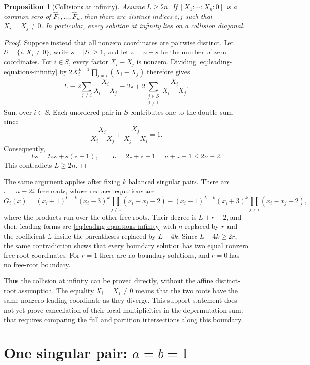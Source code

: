 \documentclass[11pt]{article}
\newtheorem{proposition}{Proposition}[section]
\theoremstyle{definition}
\begin{document}
\begin{proposition}[Collisions at infinity]
\label{prop:collisions-infinity}
Assume $L\ge2n$. If $[X_1:\cdots:X_n:0]$ is a common zero of
$\widehat F_1,\ldots,\widehat F_n$, then there are distinct indices
$i,j$ such that $X_i=X_j\ne0$. In particular, every solution at
infinity lies on a collision diagonal.
\end{proposition}

\begin{proof}
Suppose instead that all nonzero coordinates are pairwise distinct.
Let $S=\{i:X_i\ne0\}$, write $s=|S|\ge1$, and let $z=n-s$ be
the number of zero coordinates. For $i\in S$, every factor
$X_i-X_j$ is nonzero. Dividing
\eqref{eq:leading-equations-infinity} by
$2X_i^{L-1}\prod_{j\ne i}(X_i-X_j)$ therefore gives
\[
 L=2\sum_{j\ne i}\frac{X_i}{X_i-X_j}
   =2z+2\sum_{\substack{j\in S\\j\ne i}}
                     \frac{X_i}{X_i-X_j}.
\]
Sum over $i\in S$. Each unordered pair in $S$ contributes one to
the double sum, since
\[
 \frac{X_i}{X_i-X_j}+\frac{X_j}{X_j-X_i}=1.
\]
Consequently,
\[
 Ls=2zs+s(s-1),\qquad
 L=2z+s-1=n+z-1\le2n-2.
\]
This contradicts $L\ge2n$.
\end{proof}

The same argument applies after fixing $k$ balanced singular pairs.
There are $r=n-2k$ free roots, whose reduced equations are
\[
 G_i(x)=(x_i+1)^{L-k}(x_i-3)^k
                \prod_{j\ne i}(x_i-x_j-2)
       -(x_i-1)^{L-k}(x_i+3)^k
                \prod_{j\ne i}(x_i-x_j+2),
\]
where the products run over the other free roots. Their degree is
$L+r-2$, and their leading forms are
\eqref{eq:leading-equations-infinity} with $n$ replaced by $r$ and
the coefficient $L$ inside the parentheses replaced by $L-4k$.
Since $L-4k\ge2r$, the same contradiction shows that every boundary
solution has two equal nonzero free-root coordinates. For $r=1$
there are no boundary solutions, and $r=0$ has no free-root boundary.

Thus the collision at infinity can be proved directly, without the
affine distinct-root assumption. The equality $X_i=X_j\ne0$ means
that the two roots have the same nonzero leading coordinate as they
diverge. This support statement does not yet prove cancellation of
their local multiplicities in the depermutation sum; that requires
comparing the full and partition intersections along this boundary.
\section{One singular pair: $a=b=1$}
\label{sec:one-singular-pair}
\end{document}
